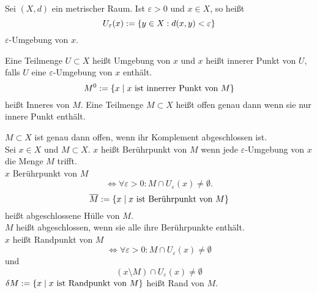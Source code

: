 \documentclass[../ana2u.tex]{subfiles}
\begin{document}
    \begin{defi}
        Sei \((X,d)\) ein metrischer Raum. 
        Ist \( \varepsilon > 0 \) und \( x\in X \), so 
        heißt 
        \[ U_\varepsilon(x) 
        := \{ y \in X: d(x,y) < \varepsilon \} \]
        \( \varepsilon \)-Umgebung von \(x\).
    \end{defi}
    \begin{defi}
        Eine Teilmenge \( U \subset X \) heißt Umgebung 
        von \(x\) und \(x\) heißt innerer Punkt von \(U\), 
        falls \(U\) eine \(\varepsilon \)-Umgebung von \(x\) 
        enthält.
        \[ M^0 := \{x \; \vert \; 
        x \text{ ist innerrer Punkt von } M \} \]
        heißt Inneres von \(M\).
        Eine Teilmenge \( M \subset X \) heißt offen genau 
        dann wenn sie nur innere Punkt enthält.
    \end{defi}
    \begin{defi}
        \( M \subset X \) ist genau dann offen, wenn 
        ihr Komplement abgeschlossen ist.\\
        Sei \( x \in X \) und \( M \subset X \). 
        \(x\) heißt Berührpunkt von \(M\) wenn jede 
        \( \varepsilon \)-Umgebung von \(x\) die Menge 
        \(M\) trifft.\\
        \( x \) Berührpunkt von \(M\) 
        \[ \Leftrightarrow \forall \varepsilon > 0: 
        M \cap U_\varepsilon(x) \neq \emptyset. \]
        \[ \overline{M} := \{ x \;\vert \; 
        x \text{ ist Berührpunkt von }M \} \] 
        heißt abgeschlossene Hülle von \(M\).\\
        \( M \) heißt abgeschlossen, wenn sie alle 
        ihre Berührpunkte enthält.\\
        \(x\) heißt Randpunkt von \( M \) 
        \[ \Leftrightarrow \forall \varepsilon > 0 : 
        M \cap U_\varepsilon(x) \neq \emptyset \] 
        und \[ (x \setminus M) \cap U_\varepsilon(x) \neq \emptyset \]
        \( \delta M := \{ x \;\vert\; x 
        \text{ ist Randpunkt von } M \} \) heißt 
        Rand von \(M\).
    \end{defi}
\end{document}
